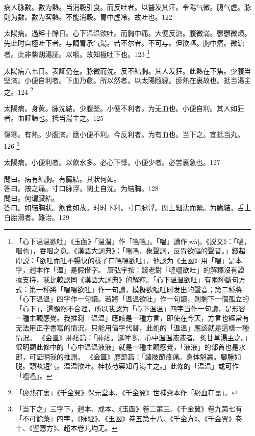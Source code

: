 病人脉數。數为熱。当消穀引食。而反吐者。以醫发其汗。令陽气微。膈气虗。脉則为數。數为客熱。不能消穀。胃中虗冷。故吐也。122

太陽病。過經十餘日。心下温温欲吐。而胸中痛。大便反溏。腹微滿。鬱鬱微煩。先{\khaaitp 此}时自極吐下者。与{\khaaitp 調胃}承气湯。若不尔者。不可与。但欲嘔。胸中痛。微溏者。此非柴胡湯証。以嘔。故知極吐下也。123
	\footnote{
		「心下温温欲吐」《玉函》「温温」作「嗢嗢」。「嗢」讀作[wà]。《説文》：「嗢，咽也」，吞咽之意。《漢語大詞典》：「嗢嗢，象聲詞，反胃欲嘔的聲音。」錢超塵説：「欲吐而吐不暢快的樣子曰嗢嗢欲吐」，他認为《玉函》用「嗢」是本字，趙本作「温」是假借字。
		唐弘宇按：錢老對「嗢嗢欲吐」的解釋沒有證據支持，我比較認同《漢語大詞典》的解釋。「心下温温欲吐」有兩種斷句方式：第一種將「嗢嗢欲吐」作一句讀，模擬欲嘔吐时发出的聲音；第二種將「心下温温」四字作一句讀。若將「温温欲吐」作一句讀，則剩下一個孤立的「心下」，這顯然不合理，所以我認为「心下温温」四字当作一句讀，是形容一種主觀感覺。我推測「温温」應該是一種方言，即使在今天，方言也經常有无法用正字書寫的情況，只能用借字代替，此処的「温温」應該就是這樣一種情況。
		《金匱》肺痿篇：「肺痿。涎唾多。心中温温液液者。炙甘草湯主之。」很明顯此條中的「心中温温液液」就是一種主觀感覺，「液液」的部首也是水部，可証明我的推測。
		《金匱》歷節篇：「諸肢節疼痛。身体魁羸。腳腫如脱。頭眩短气。温温欲吐。桂枝芍藥知母湯主之。」此條的「温温」或可作「嗢嗢」。
	}

太陽病六七日。表証仍在。脉微而沈。反不結胸。其人发狂。此熱在下焦。少腹当堅滿。小便自利者。下血乃愈。所以然者。以太陽隨經。瘀熱在裏故也。抵当湯主之。124
	\footnote{
		「瘀熱在裏」《千金翼》保元堂本、《千金翼》世補齋本作「瘀血在裏」。
	}

太陽病。身黄。脉沈結。少腹堅。小便不利者。为无血也。小便自利。其人如狂者。血証諦也。抵当湯主之。125

傷寒。有熱。少腹滿。應小便不利。今反利者。为有血也。当下之。宜抵当丸。126
	\footnote{
		「当下之」三字下，趙本、成本、《玉函》卷二第三、《千金翼》卷九第七有「不可餘藥」四字，《脉經》、《玉函》卷五第十八、《千金方》、《千金翼》卷十、《聖惠方》、趙本卷九均无。
	}

太陽病。小便利者。以飲水多。必心下悸。小便少者。必苦裏急也。127

問曰。病有結胸。有臓結。其狀何如。\\
答曰。按之痛。寸口脉浮。関上自沈。为結胸。128\\
問曰。何谓臓結。\\
答曰。如結胸狀。飲食如故。时时下利。寸口脉浮。関上細沈而緊。为臓結。舌上白胎滑者。難治。129

